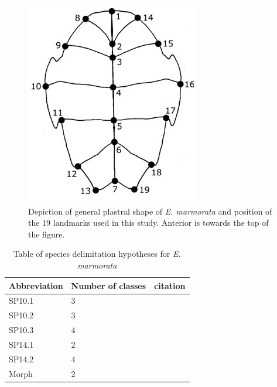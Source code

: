 \documentclass[12pt,letterpaper]{article}
\begin{document}
\begin{figure}[h]
  \centering
  \includegraphics[height = 0.5\textheight, width = \textwidth, keepaspectratio = true]{figure/plastra}
  \caption{Depiction of general plastral shape of \textit{E. marmorata} and position of the 19 landmarks used in this study. Anterior is towards the top of the figure.}
  \label{fig:plastra}
\end{figure}

\begin{table}
  \centering
    \caption{Table of species delimitation hypotheses for \textit{E. marmorata}}
    \begin{tabular}{l l l }
      \hline
      Abbreviation & Number of classes & citation \\
      \hline
      SP10.1 & 3 & \citet{Spinks2010} \\
      SP10.2 & 3 & \citet{Spinks2010} \\
      SP10.3 & 4 & \citet{Spinks2010} \\
      SP14.1 & 2 & \citet{Spinks2014} \\
      SP14.2 & 4 & \citet{Spinks2014} \\
      Morph & 2 & \citet{Spinks2010} \\
      \hline
    \end{tabular}
    \label{tab:hypotheses}
\end{table}
\end{document}
